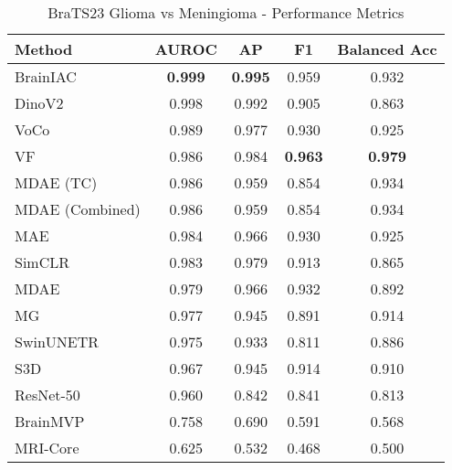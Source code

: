 \begin{table}[ht]
\centering
\caption{BraTS23 Glioma vs Meningioma - Performance Metrics}
\label{tab:brats23_gli_vs_men}
\begin{tabular}{lcccc}
\toprule
Method & AUROC & AP & F1 & Balanced Acc \\
\midrule
BrainIAC & \textbf{0.999} & \textbf{0.995} & 0.959 & 0.932 \\
DinoV2 & 0.998 & 0.992 & 0.905 & 0.863 \\
VoCo & 0.989 & 0.977 & 0.930 & 0.925 \\
VF & 0.986 & 0.984 & \textbf{0.963} & \textbf{0.979} \\
MDAE (TC) & 0.986 & 0.959 & 0.854 & 0.934 \\
MDAE (Combined) & 0.986 & 0.959 & 0.854 & 0.934 \\
MAE & 0.984 & 0.966 & 0.930 & 0.925 \\
SimCLR & 0.983 & 0.979 & 0.913 & 0.865 \\
MDAE & 0.979 & 0.966 & 0.932 & 0.892 \\
MG & 0.977 & 0.945 & 0.891 & 0.914 \\
SwinUNETR & 0.975 & 0.933 & 0.811 & 0.886 \\
S3D & 0.967 & 0.945 & 0.914 & 0.910 \\
ResNet-50 & 0.960 & 0.842 & 0.841 & 0.813 \\
BrainMVP & 0.758 & 0.690 & 0.591 & 0.568 \\
MRI-Core & 0.625 & 0.532 & 0.468 & 0.500 \\
\bottomrule
\end{tabular}
\end{table}
